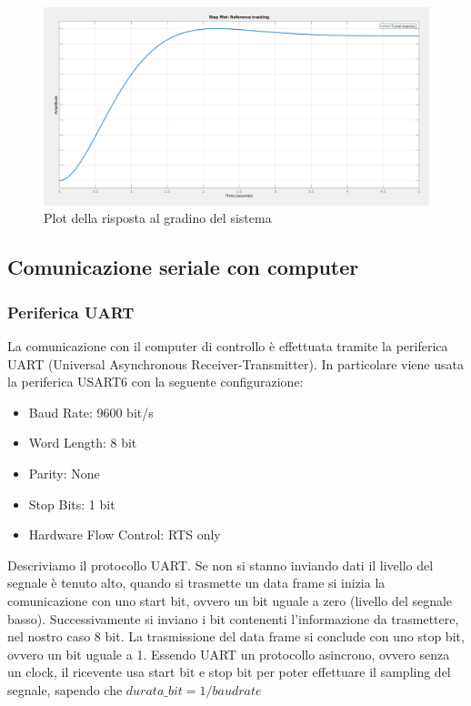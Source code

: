\begin{figure}[H]
    \centering
    \includegraphics[width=\textwidth]{images/pid_plot.png}
    \caption{Plot della risposta al gradino del sistema}
    \label{fig:pid}
\end{figure}

\subsection{Comunicazione seriale con computer}

\subsubsection{Periferica UART}
La comunicazione con il computer di controllo è effettuata tramite la periferica UART (Universal Asynchronous Receiver-Transmitter). In particolare viene usata la periferica USART6 con la seguente configurazione:

\begin{itemize}
    \item Baud Rate: 9600 bit/s
    \item Word Length: 8 bit
    \item Parity: None
    \item Stop Bits: 1 bit
    \item Hardware Flow Control: RTS only
\end{itemize}

Descriviamo il protocollo UART. Se non si stanno inviando dati il livello del segnale è tenuto alto, quando si trasmette un data frame si inizia la comunicazione con uno start bit, ovvero un bit uguale a zero (livello del segnale basso). Successivamente si inviano i bit contenenti l'informazione da trasmettere, nel nostro caso 8 bit. La trasmissione del data frame si conclude con uno stop bit, ovvero un bit uguale a 1. Essendo UART un protocollo asincrono, ovvero senza un clock, il ricevente usa start bit e stop bit per poter effettuare il sampling del segnale, sapendo che $durata\_bit = 1/baud rate$

